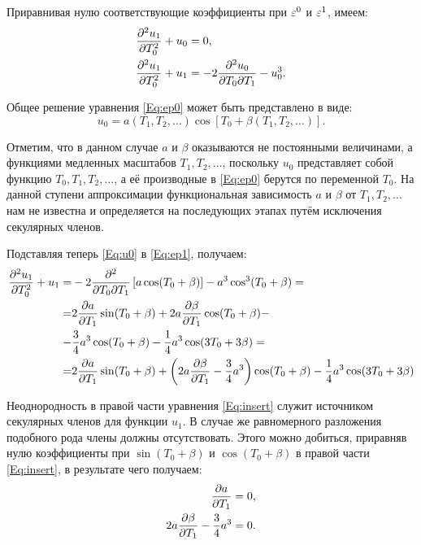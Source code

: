 Приравнивая нулю соответствующие коэффициенты при $\varepsilon^0$ и $\varepsilon^1$,
имеем:
\begin{align}
    \pdv[2]{u_1}{T_0} + u_0 & = 0, \label{Eq:ep0} \\ 
    \pdv[2]{u_1}{T_0} + u_1 & = -2 \pdv{u_0}{T_0}{T_1} - u_0^3. \label{Eq:ep1} 
\end{align}

Общее решение уравнения \eqref{Eq:ep0}
может быть представлено в виде:
\begin{equation} \label{Eq:u0}
    u_0 = a(T_1, T_2, \dots) \cos\left[T_0 + \beta(T_1, T_2, \dots)\right]. 
\end{equation}

Отметим, что в данном случае $a$ и $\beta$ оказываются
не постоянными величинами, а функциями медленных масштабов $T_1, T_2, \dots$,
поскольку $u_0$ представляет собой функцию $T_0, T_1, T_2, \dots$,
а её производные в \eqref{Eq:ep0} берутся по переменной $T_0$.
На данной ступени аппроксимации функциональная зависимость
$a$ и $\beta$ от $T_1, T_2, \dots$ нам не известна и определяется
на последующих этапах путём исключения секулярных членов.

Подставляя теперь \eqref{Eq:u0} в \eqref{Eq:ep1}, получаем:
\begin{align}
    \pdv[2]{u_1}{T_0} + u_1 = &
    -2 \pdv{}{T_0}{T_1} \left[ a \cos(T_0 + \beta) \right]
    -a^3 \cos^3(T_0 + \beta) = \nonumber \\
    = & 2 \pdv{a}{T_1} \sin(T_0 + \beta) +
    2 a \pdv{\beta}{T_1} \cos(T_0 + \beta) - \nonumber \\
    - & \frac{3}{4} a^3 \cos(T_0 + \beta) -
    \frac{1}{4} a^3 \cos(3 T_0 + 3 \beta) = \nonumber \\
    = & 2 \pdv{a}{T_1} \sin(T_0 + \beta) +
    \left( 2 a \pdv{\beta}{T_1} - \frac{3}{4} a^3 \right)
    \cos(T_0 + \beta) - \frac{1}{4} a^3 \cos(3 T_0 + 3 \beta) \label{Eq:insert}
\end{align}

Неоднородность в правой части уравнения \eqref{Eq:insert}
служит источником секулярных членов для функции $u_1$.
В случае же равномерного разложения подобного рода члены
должны отсутствовать.
Этого можно добиться, приравняв нулю коэффициенты при
$\sin(T_0 + \beta)$ и $\cos(T_0 + \beta)$
в правой части \eqref{Eq:insert},
в результате чего получаем:
\begin{align}
    \pdv{a}{T_1} & = 0, \label{Eq:seq0} \\
    2 a \pdv{\beta}{T_1} - \frac{3}{4} a^3 & = 0. \label{Eq:seq1}
\end{align}

